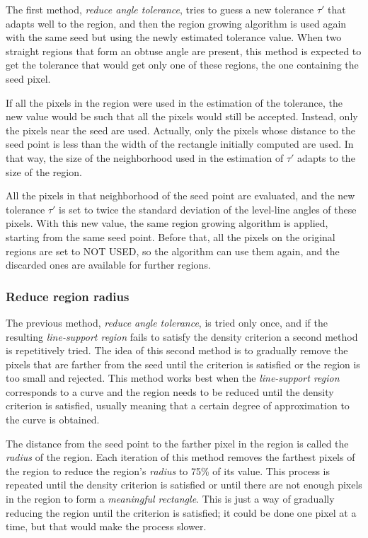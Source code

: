 \documentclass{ipol}
\begin{document}
The first method, \emph{reduce angle tolerance}, tries to guess a new
tolerance $\tau'$ that adapts well to the region, and then the region
growing algorithm is used again with the same seed but using the newly
estimated tolerance value. When two straight regions that form an
obtuse angle are present, this method is expected to get the tolerance
that would get only one of these regions, the one containing the seed
pixel.

If all the pixels in the region were used in the estimation of the
tolerance, the new value would be such that all the pixels would still
be accepted. Instead, only the pixels near the seed are
used. Actually, only the pixels whose distance to the seed point is
less than the width of the rectangle initially computed are used. In
that way, the size of the neighborhood used in the estimation of
$\tau'$ adapts to the size of the region.

All the pixels in that neighborhood of the seed point are evaluated,
and the new tolerance $\tau'$ is set to twice the standard deviation
of the level-line angles of these pixels. With this new value, the
same region growing algorithm is applied, starting from the same seed
point. Before that, all the pixels on the original regions are set to
NOT USED, so the algorithm can use them again, and the discarded ones
are available for further regions.


\subsubsection{Reduce region radius}

The previous method, \emph{reduce angle tolerance}, is tried only
once, and if the resulting \emph{line-support region} fails to satisfy
the density criterion a second method is repetitively tried. The idea
of this second method is to gradually remove the pixels that are
farther from the seed until the criterion is satisfied or the region
is too small and rejected. This method works best when
the \emph{line-support region} corresponds to a curve and the region
needs to be reduced until the density criterion is satisfied, usually
meaning that a certain degree of approximation to the curve is
obtained.

The distance from the seed point to the farther pixel in the region is
called the \emph{radius} of the region. Each iteration of this method
removes the farthest pixels of the region to reduce the region's
\emph{radius} to 75\% of its value. This process is repeated until the
density criterion is satisfied or until there are not enough pixels in
the region to form a \emph{meaningful rectangle}. This is just a way of
gradually reducing the region until the criterion is satisfied; it
could be done one pixel at a time, but that would make the process
slower.
\end{document}
